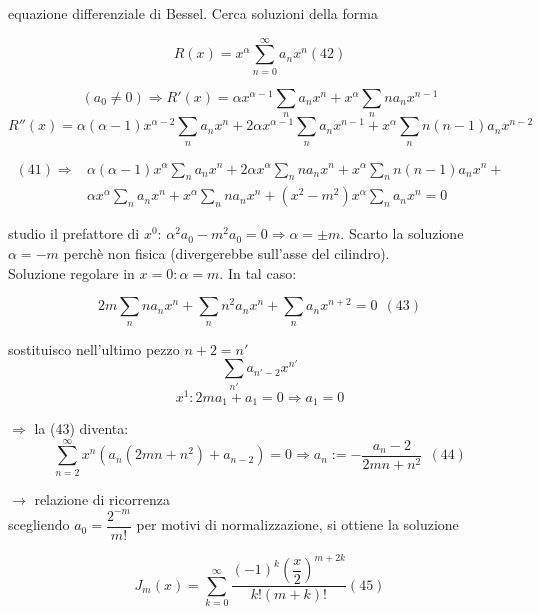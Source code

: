 \documentclass[a4paper,11pt]{report}
\begin{document}
equazione differenziale di Bessel. Cerca soluzioni della forma

\begin{equation}
R(x)=x^\alpha \sum_{n=0}^{\infty} a_nx^n(42)
\end{equation}

$$
(a_0\neq 0)\Rightarrow R'(x)=\alpha x^{\alpha -1}\sum_n a_nx^n + x^\alpha\sum_n na_nx^{n-1}
$$
$$
R''(x)=\alpha(\alpha-1)x^{\alpha-2}\sum_na_nx^n + 2\alpha x^{\alpha-1}\sum_n a_n x^{n-1}+x^\alpha\sum_n n(n-1)a_nx^{n-2}
$$

\begin{equation*}
\begin{split}
(41)\Rightarrow &\alpha(\alpha-1)x^\alpha\sum_n a_n x^n+2\alpha x^\alpha \sum_n n a_n x^n + x^\alpha \sum_n n(n-1)a_n x^n + \\
& \alpha x^\alpha\sum_n a_n x^n + x^\alpha \sum_n n a_n x^n + (x^2-m^2)x^\alpha \sum_n a_n x^n=0
\end{split}
\end{equation*}

studio il prefattore di $x^0$: $\alpha^2 a_0-m^2a_0=0\Rightarrow \alpha=\pm m$. Scarto la soluzione $\alpha=-m$ perchè non fisica (divergerebbe sull'asse del cilindro).\\
Soluzione regolare in $x=0: \alpha=m$. In tal caso:

\begin{equation}
2m\sum_n n a_n x^n + \sum_n n^2 a_n x^n + \sum_n a_n x^{n+2}=0 ~~(43)
\end{equation}

sostituisco nell'ultimo pezzo $n+2=n'$
$$
\sum_{n'} a_{n'-2} x^{n'}
$$
$$
x^1: 2ma_1+a_1=0 \Rightarrow a_1=0 
$$

$\Rightarrow$ la (43) diventa:
\begin{equation}
\sum_{n=2}^{\infty}x^n(a_n(2mn+n^2)+a_{n-2})=0 \Rightarrow a_n := - \dfrac{a_n-2}{2mn+n^2} ~~ (44)
\end{equation}

$\rightarrow$ relazione di ricorrenza\\

scegliendo $a_0=\dfrac{2^{-m}}{m!}$ per motivi di normalizzazione, si ottiene la soluzione

\begin{equation}
J_m(x)=\sum_{k=0}^{\infty}\dfrac{(-1)^k\left(\dfrac{x}{2}\right)^{m+2k}}{k!(m+k)!} (45)
\end{equation}
\end{document}
